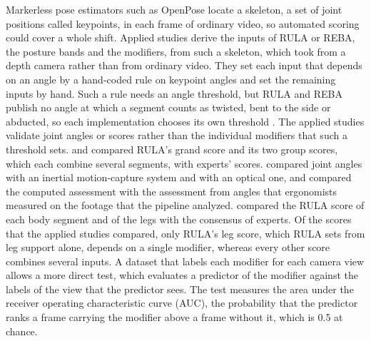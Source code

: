 \documentclass[review,3p,authoryear]{elsarticle}
\begin{document}
Markerless pose estimators such as OpenPose \citep{cao2021openpose} locate a skeleton, a
set of joint positions called keypoints, in each frame of ordinary video, so automated
scoring could cover a whole shift. Applied studies
\citep{kim2021openpose,lin2022realtime,nayak2021rula,plantard2017kinect,agostinelli2024validation,kwon2022singleview}
derive the inputs of RULA or REBA, the posture bands and the modifiers, from such a
skeleton, which \citet{plantard2017kinect} took from a depth camera rather than from
ordinary video. They set each input that depends on an angle by a hand-coded rule on keypoint
angles and set the remaining inputs by hand. Such a rule
needs an angle threshold, but RULA and REBA publish no angle at which a segment counts as
twisted, bent to the side or abducted,
so each implementation chooses its own threshold \citep{vignais2017bsn}. The applied studies
validate joint angles or scores rather than the individual modifiers that such a threshold
sets. \citet{nayak2021rula} and \citet{plantard2017kinect}
compared RULA's grand score and its two group scores, which each combine several
segments, with experts' scores. \citet{kim2021openpose} compared joint angles with an
inertial motion-capture system and \citet{lin2022realtime} with an optical one, and \citet{agostinelli2024validation} compared the computed
assessment with the assessment from angles that ergonomists measured on the footage that
the pipeline analyzed. \citet{kwon2022singleview} compared the RULA score of each body segment
and of the legs with the consensus of experts. Of the scores that the applied studies compared,
only RULA's leg score, which RULA sets from leg support alone, depends on a single
modifier, whereas every other score combines several inputs. A dataset that labels each
modifier for each camera view allows a more direct test, which evaluates a predictor of the
modifier against the labels of the view that the predictor sees. The test measures the
area under the receiver operating characteristic curve (AUC), the probability that the
predictor ranks a frame carrying the modifier above a frame without it, which is 0.5 at
chance.
\end{document}
